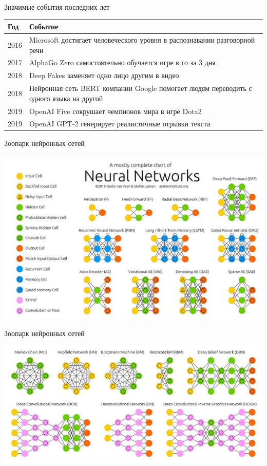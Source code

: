 \documentclass{beamer}
\begin{document}
\begin{frame}{Значимые события последних лет}
\begin{center}
\begin{tabular}{|p{0.4in}|p{3.5in}|}\hline
\textbf{Год}& \textbf{Событие} \\
\hline
2016 & \textsf{Microsoft достигает человеческого уровня в распознавании разговорной речи} \\\hline
2017 & \textsf{AlphaGo Zero самостоятельно обучается игре в го за 3 дня} \\\hline
2018 & \textsf{Deep Fakes заменяет одно лицо другим в видео} \\\hline
2018 & \textsf{Нейронная сеть BERT компании Google помогает людям переводить с одного языка
на другой} \\\hline
2019 & \textsf{OpenAI Five сокрушает чемпионов мира в игре Dota2} \\\hline
2019 & \textsf{OpenAI GPT-2 генерирует реалистичные отрывки текста} \\\hline
\end{tabular}
\end{center}
\end{frame}


\begin{frame}{Зоопарк нейронных сетей}
\begin{center}
\includegraphics[width=1.0\textwidth]{img/a1.jpg}
\end{center}
\end{frame}

\begin{frame}{Зоопарк нейронных сетей}
\begin{center}
\includegraphics[width=1.0\textwidth]{img/a2.jpg}
\end{center}
\end{frame}
\end{document}
